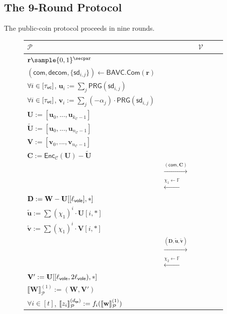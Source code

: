 \documentclass[11pt,a4paper]{article}
\theoremstyle{definition}
\theoremstyle{remark}
\newcommand{\F}{\mathbb{F}}
\newcommand{\calC}{\mathcal{C}}
\newcommand{\itmacP}[1]{\llbracket {#1} \rrbracket_{\calP}}
\newcommand{\calP}{\mathcal{P}}
\newcommand{\calV}{\mathcal{V}}
\newcommand{\mat}[1]{\mathbf{#1}}
\renewcommand{\vec}[1]{\mathbf{#1}}
\newcommand{\msgrightarrow}[1]{\xrightarrow{\textstyle#1}}
\newcommand{\msgleftarrow}[1]{\xleftarrow{\textstyle#1}}
\begin{document}
\subsection{The 9-Round Protocol}

The public-coin protocol proceeds in nine rounds.

\begin{figure}[H]
	\centering
	\begin{tabular}{p{0.45\linewidth}>{\centering\arraybackslash}p{0.2\linewidth}p{0.3\linewidth}}
		\toprule
		$\calP$ & & $\calV$ \\
		\midrule
		$\vec{r} \sample \{ 0,1 \}^{\secpar}$ & & \\
		$(\mathsf{com}, \mathsf{decom}, \{\mathsf{sd}_{i,j}\}) \gets \mathsf{BAVC.Com}(\vec{r})$ & & \\
		$\forall i \in [\tau_{\sf vc}]$, $\vec{u}_i := \sum_{j} \mathsf{PRG}(\mathsf{sd}_{i,j})$ & & \\
		$\forall i \in [\tau_{\sf vc}]$, $\vec{v}_i := \sum_{j} (- \alpha_j) \cdot \mathsf{PRG}(\mathsf{sd}_{i,j})$ & & \\
		$\mat{U} := [\vec{u}_0, ..., \vec{u}_{k_{\calC}-1}]$ & & \\
		$\widetilde{\mat{U}} := [\vec{u}_0, ..., \vec{u}_{n_{\calC}-1}]$ & & \\
		$\mat{V} := [\vec{v}_0, ..., \vec{v}_{n_{\calC} - 1}]$ & & \\
		$\mat{C} := \mathsf{Enc}_{\calC}(\mat{U}) - \widetilde{\mat{U}}$ & & \\
		& $\msgrightarrow{(\mathsf{com}, \mat{C})}$ & \\
		& $\msgleftarrow{\chi_1 \gets \F}$ & \\
		$\mat{D} := \mat{W} - \mat{U}[[\ell_{\sf vole}], *]$ & & \\
		$\tilde{\vec{u}} := \sum ( \chi_1 )^{i} \cdot \mat{U}[i, *]$ & & \\
		$\tilde{\vec{v}} := \sum ( \chi_1 )^{i} \cdot \mat{V}[i, *]$ & & \\
		& $\msgrightarrow{(\mat{D}, \tilde{\vec{u}}, \tilde{\vec{v}})}$ & \\
		& $\msgleftarrow{\chi_2 \gets \F}$ & \\ 
		$ \mat{V}' := \mat{U}[[\ell_{\sf vole}, 2\ell_{\sf vole}), *] $ & & \\
		$\itmacP{\mat{W}}^{(1)} := (\mat{W}, \mat{V}')$ & & \\
		$ \forall i \in [t]$, $\itmacP{z_i}^{(d_{\sf qs})} := f_i(\itmacP{\vec{w}}^{(1)})$ & & \\

\end{tabular}
\end{figure}
\end{document}
